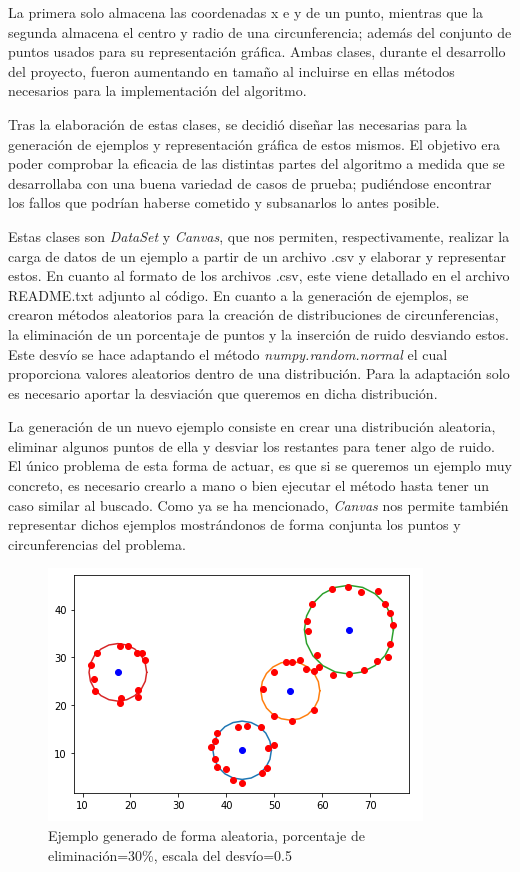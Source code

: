 \documentclass[conference,a4paper]{IEEEtran}
\begin{document}
La primera solo almacena las coordenadas x e y de un punto, mientras que la segunda almacena el centro y radio de una circunferencia; además del conjunto de puntos usados para su representación gráfica. Ambas clases, durante el desarrollo del proyecto, fueron aumentando en tamaño al incluirse en ellas métodos necesarios para la implementación del algoritmo.

Tras la elaboración de estas clases, se decidió diseñar las necesarias para la generación de ejemplos y representación gráfica de estos mismos. El objetivo era poder comprobar la eficacia de las distintas partes del algoritmo a medida que se desarrollaba con una buena variedad de casos de prueba; pudiéndose encontrar los fallos que podrían haberse cometido y subsanarlos lo antes posible.

Estas clases son \textit{DataSet} y  \textit{Canvas}, que nos permiten, respectivamente, realizar la carga de datos de un ejemplo a partir de un archivo .csv y elaborar y representar estos. En cuanto al formato de los archivos .csv, este viene detallado en el archivo README.txt adjunto al código. En cuanto a la generación de ejemplos, se crearon métodos aleatorios para la creación de distribuciones de circunferencias, la eliminación de un porcentaje de puntos y la inserción de ruido desviando estos. Este desvío se hace adaptando el método \textit{numpy.random.normal} el cual proporciona valores aleatorios dentro de una distribución. Para la adaptación solo es necesario aportar la desviación que queremos en dicha distribución.

La generación de un nuevo ejemplo consiste en crear una distribución aleatoria, eliminar algunos puntos de ella y desviar los restantes para tener algo de ruido. El único problema de esta forma de actuar, es que si se queremos un ejemplo muy concreto, es necesario crearlo a mano o bien ejecutar el método hasta tener un caso similar al buscado. Como ya se ha mencionado, \textit{Canvas} nos permite también representar dichos ejemplos mostrándonos de forma conjunta los puntos y circunferencias del problema.

\begin{figure}[H]
\centering
\includegraphics[scale=0.8]{EjemploGenerado}
\caption{Ejemplo generado de forma aleatoria, porcentaje de eliminación=30\%, escala del desvío=0.5}
\end{figure}
\end{document}
